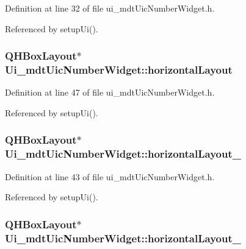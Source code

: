 Definition at line 32 of file ui\-\_\-mdt\-Uic\-Number\-Widget.\-h.



Referenced by setup\-Ui().

\hypertarget{class_ui__mdt_uic_number_widget_ae7123528d1ea9e431a18ecb4ddcefbba}{
\subsubsection[{horizontal\-Layout}]{\setlength{\rightskip}{0pt plus 5cm}Q\-H\-Box\-Layout$\ast$ Ui\-\_\-mdt\-Uic\-Number\-Widget\-::horizontal\-Layout}}\label{class_ui__mdt_uic_number_widget_ae7123528d1ea9e431a18ecb4ddcefbba}


Definition at line 47 of file ui\-\_\-mdt\-Uic\-Number\-Widget.\-h.



Referenced by setup\-Ui().

\hypertarget{class_ui__mdt_uic_number_widget_a7cdf97b40ff73aad81bde1346d69f07d}{
\subsubsection[{horizontal\-Layout\-\_\-2}]{\setlength{\rightskip}{0pt plus 5cm}Q\-H\-Box\-Layout$\ast$ Ui\-\_\-mdt\-Uic\-Number\-Widget\-::horizontal\-Layout\-\_}}\label{class_ui__mdt_uic_number_widget_a7cdf97b40ff73aad81bde1346d69f07d}


Definition at line 43 of file ui\-\_\-mdt\-Uic\-Number\-Widget.\-h.



Referenced by setup\-Ui().

\hypertarget{class_ui__mdt_uic_number_widget_a05657f94a0b4ba393f651c86c0307648}{
\subsubsection[{horizontal\-Layout\-\_\-3}]{\setlength{\rightskip}{0pt plus 5cm}Q\-H\-Box\-Layout$\ast$ Ui\-\_\-mdt\-Uic\-Number\-Widget\-::horizontal\-Layout\-\_}}\label{class_ui__mdt_uic_number_widget_a05657f94a0b4ba393f651c86c0307648}


